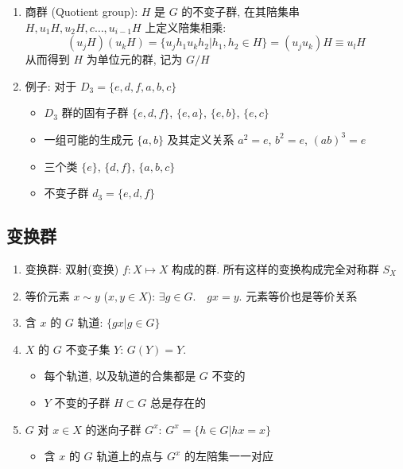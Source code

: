 \documentclass[12pt,a4paper]{article}%
\numberwithin{equation}{section}%
\begin{document}
\begin{enumerate}
\begin{itemize}
	\end{itemize}
	\item 商群 (Quotient group): $H$ 是 $G$ 的不变子群, 在其陪集串 $H, u_1H, u_2H,c\dots, u_{i-1}H$ 上定义陪集相乘: 
	\begin{equation}
		(u_j H)(u_k H) = \{u_jh_1u_kh_2|h_1,h_2\in H\} = (u_j u_k)H \equiv u_l H
	\end{equation}
	从而得到 $H$ 为单位元的群, 记为 $G/H$
	\item 例子: 对于 $D_3 = \{e,d,f,a,b,c\}$
	\begin{itemize}
		\item $D_3$ 群的固有子群 $\{e,d,f\}$, $\{e,a\}$, $\{e,b\}$, $\{e,c\}$
		\item 一组可能的生成元 $\{a,b\}$ 及其定义关系 $a^2=e$, $b^2=e$, $(ab)^3=e$
		\item 三个类 $\{e\}$, $\{d,f\}$, $\{a,b,c\}$
		\item 不变子群 $d_3 = \{e,d,f\}$
	\end{itemize}
\end{enumerate}
\subsection{变换群} %
\label{sub:trans_group}
\begin{enumerate}
	\item 变换群: 双射(变换) $f:X\mapsto X$ 构成的群. 所有这样的变换构成完全对称群 $S_X$
	\item 等价元素 $x\sim y$ ($x,y\in X$): $\exists g\in G.\quad gx = y$. 元素等价也是等价关系
	\item 含 $x$ 的 $G$ 轨道: $\{gx|g\in G\}$
	\item $X$ 的 $G$ 不变子集 $Y$: $G(Y) = Y$. 
	\begin{itemize}
		\item 每个轨道, 以及轨道的合集都是 $G$ 不变的
		\item $Y$ 不变的子群 $H\subset G$ 总是存在的
	\end{itemize}
	\item $G$ 对 $x\in X$ 的迷向子群 $G^{x}$: $G^x = \{h\in G|hx=x\}$
	\begin{itemize}
		\item 含 $x$ 的 $G$ 轨道上的点与 $G^x$ 的左陪集一一对应
	\end{itemize}
\end{enumerate}
\end{document}
